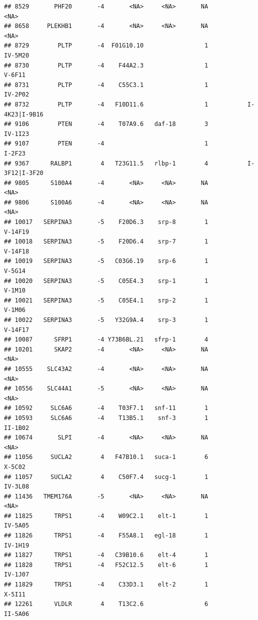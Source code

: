 \documentclass[
]{article}
\begin{document}
\begin{verbatim}
## 8529       PHF20       -4       <NA>     <NA>       NA                    <NA>
## 8658     PLEKHB1       -4       <NA>     <NA>       NA                    <NA>
## 8729        PLTP       -4  F01G10.10                 1                 IV-5M20
## 8730        PLTP       -4    F44A2.3                 1                  V-6F11
## 8731        PLTP       -4    C55C3.1                 1                 IV-2P02
## 8732        PLTP       -4   F10D11.6                 1           I-4K23|I-9B16
## 9106        PTEN       -4    T07A9.6   daf-18        3                 IV-1I23
## 9107        PTEN       -4                            1                  I-2F23
## 9367      RALBP1        4   T23G11.5   rlbp-1        4           I-3F12|I-3F20
## 9805      S100A4       -4       <NA>     <NA>       NA                    <NA>
## 9806      S100A6       -4       <NA>     <NA>       NA                    <NA>
## 10017   SERPINA3       -5    F20D6.3    srp-8        1                 V-14F19
## 10018   SERPINA3       -5    F20D6.4    srp-7        1                 V-14F18
## 10019   SERPINA3       -5   C03G6.19    srp-6        1                  V-5G14
## 10020   SERPINA3       -5    C05E4.3    srp-1        1                  V-1M10
## 10021   SERPINA3       -5    C05E4.1    srp-2        1                  V-1M06
## 10022   SERPINA3       -5   Y32G9A.4    srp-3        1                 V-14F17
## 10087      SFRP1       -4 Y73B6BL.21   sfrp-1        4                        
## 10201      SKAP2       -4       <NA>     <NA>       NA                    <NA>
## 10555    SLC43A2       -4       <NA>     <NA>       NA                    <NA>
## 10556    SLC44A1       -5       <NA>     <NA>       NA                    <NA>
## 10592     SLC6A6       -4    T03F7.1   snf-11        1                        
## 10593     SLC6A6       -4    T13B5.1    snf-3        1                 II-1B02
## 10674       SLPI       -4       <NA>     <NA>       NA                    <NA>
## 11056     SUCLA2        4   F47B10.1   suca-1        6                  X-5C02
## 11057     SUCLA2        4    C50F7.4   sucg-1        1                 IV-3L08
## 11436   TMEM176A       -5       <NA>     <NA>       NA                    <NA>
## 11825      TRPS1       -4    W09C2.1    elt-1        1                 IV-5A05
## 11826      TRPS1       -4    F55A8.1   egl-18        1                 IV-1H19
## 11827      TRPS1       -4   C39B10.6    elt-4        1                        
## 11828      TRPS1       -4   F52C12.5    elt-6        1                 IV-1J07
## 11829      TRPS1       -4    C33D3.1    elt-2        1                  X-5I11
## 12261      VLDLR        4    T13C2.6                 6                 II-5A06
\end{verbatim}
\end{document}

